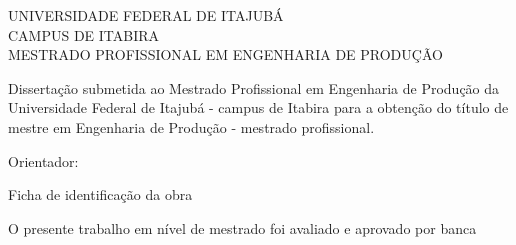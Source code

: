     \onehalfspacing \begin{center}
        UNIVERSIDADE FEDERAL DE ITAJUBÁ\\
        CAMPUS DE ITABIRA \\
        MESTRADO PROFISSIONAL EM ENGENHARIA DE PRODUÇÃO 
    \end{center}
    \vspace{5cm}
    \center \AuthorName
    \vspace{5cm}
    \center \Title \Subtitle
    \null\vfil
    \center \Location
    \center \Year
    \pagestyle{empty}
    \pagebreak

    \center \AuthorName
    \vspace{9cm}
    \center \Title \Subtitle

    \vspace{4cm}
    \begin{changemargin}{8cm}{0cm} 
        \begin{fontsize}{10}{12} \selectfont
            Dissertação submetida ao Mestrado Profissional em Engenharia de Produção da Universidade Federal de Itajubá - campus de Itabira para a obtenção do título de mestre em Engenharia de Produção - mestrado profissional.  
            
            Orientador: \Supervisor
        \end{fontsize}
    \end{changemargin}
    \null\vfil
    \center \Location
    \center \Year
    \pagebreak

    \center

    \null\vfil \vspace{12cm}

    Ficha de identificação da obra

    \pagebreak

    \center
    \AuthorName
    \vspace{1cm}

    \Title \Subtitle
    \vspace{1cm}


    O presente trabalho em nível de mestrado foi avaliado e aprovado por banca 
    
